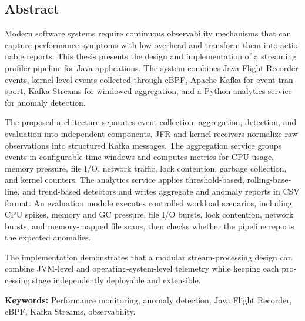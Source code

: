 \begin{latin}
\chapter*{Abstract}
Modern software systems require continuous observability mechanisms that can capture performance symptoms with low overhead and transform them into actionable reports. This thesis presents the design and implementation of a streaming profiler pipeline for Java applications. The system combines Java Flight Recorder events, kernel-level events collected through eBPF, Apache Kafka for event transport, Kafka Streams for windowed aggregation, and a Python analytics service for anomaly detection.

The proposed architecture separates event collection, aggregation, detection, and evaluation into independent components. JFR and kernel receivers normalize raw observations into structured Kafka messages. The aggregation service groups events in configurable time windows and computes metrics for CPU usage, memory pressure, file I/O, network traffic, lock contention, garbage collection, and kernel counters. The analytics service applies threshold-based, rolling-baseline, and trend-based detectors and writes aggregate and anomaly reports in CSV format. An evaluation module executes controlled workload scenarios, including CPU spikes, memory and GC pressure, file I/O bursts, lock contention, network bursts, and memory-mapped file scans, then checks whether the pipeline reports the expected anomalies.

The implementation demonstrates that a modular stream-processing design can combine JVM-level and operating-system-level telemetry while keeping each processing stage independently deployable and extensible.

\textbf{Keywords:} Performance monitoring, anomaly detection, Java Flight Recorder, eBPF, Kafka Streams, observability.
\end{latin}
